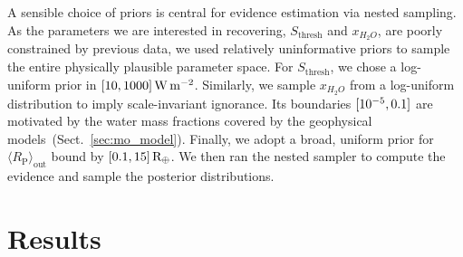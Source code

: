 \documentclass[modern]{aastex631}
\begin{document}
A sensible choice of priors is central for evidence estimation via nested sampling.
As the parameters we are interested in recovering, $S_\mathrm{thresh}$ and $x_{H_2O}$, are poorly constrained by previous data, we used relatively uninformative priors to sample the entire physically plausible parameter space.
For $S_\mathrm{thresh}$, we chose a log-uniform prior in $[10,1000]\, \SI{}{\watt\per\meter\squared}$.
Similarly, we sample $x_{H_2O}$ from a log-uniform distribution to imply scale-invariant ignorance.
Its boundaries $[10^{-5}, 0.1]$ are motivated by the water mass fractions covered by the geophysical models~(Sect.~\ref{sec:mo_model}).
Finally, we adopt a broad, uniform prior for $\langle R_\mathrm{P}\rangle_\mathrm{out}$ bound by $[0.1, 15] \, \mathrm{R_\oplus}$.
We then ran the nested sampler to compute the evidence and sample the posterior distributions.



\section{Results}
\end{document}
